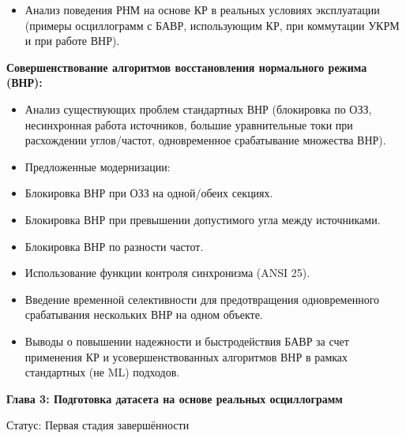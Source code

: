 
\begin{itemize}
  \item Анализ поведения РНМ на основе КР в реальных условиях эксплуатации (примеры осциллограмм с БАВР, использующим КР, при коммутации УКРМ и при работе ВНР).
\end{itemize}
\noindent\textbf{Совершенствование алгоритмов восстановления нормального режима (ВНР):}\par\vspace{0.2cm}
\begin{itemize}
  \item Анализ существующих проблем стандартных ВНР (блокировка по ОЗЗ, несинхронная работа источников, большие уравнительные токи при расхождении углов/частот, одновременное срабатывание множества ВНР).
  \item Предложенные модернизации:
  \item Блокировка ВНР при ОЗЗ на одной/обеих секциях.
  \item Блокировка ВНР при превышении допустимого угла между источниками.
  \item Блокировка ВНР по разности частот.
  \item Использование функции контроля синхронизма (ANSI 25).
  \item Введение временной селективности для предотвращения одновременного срабатывания нескольких ВНР на одном объекте.
  \item Выводы о повышении надежности и быстродействия БАВР за счет применения КР и усовершенствованных алгоритмов ВНР в рамках стандартных (не ML) подходов.
\end{itemize}
\par\vspace{0.3cm}
\noindent\textbf{Глава 3: Подготовка датасета на основе реальных осциллограмм}\par\vspace{0.2cm}
Статус: Первая стадия завершённости\par\vspace{0.2cm}
